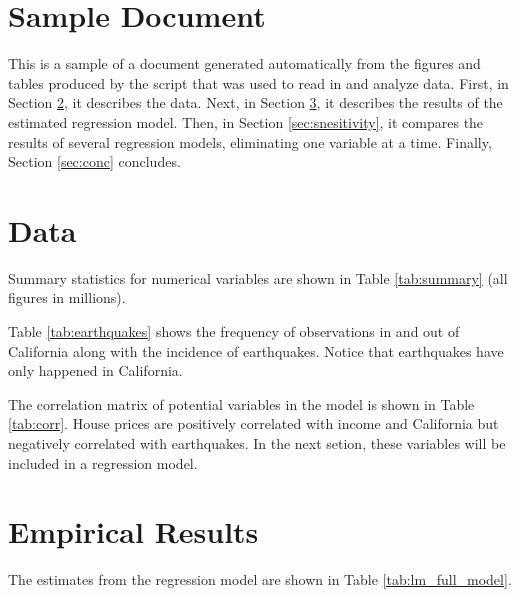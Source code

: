 \documentclass{paper}
\begin{document}

\section{Sample Document}

This is a sample of a document generated automatically from the figures and tables produced by
the script that was used to read in and analyze data.
First, in Section \ref{sec:data}, it describes the data.
Next, in Section \ref{sec:results}, it describes the results of the estimated regression model.
Then, in Section \ref{sec:snesitivity}, it compares the results of several regression models, eliminating one variable at a time.
Finally, Section \ref{sec:conc} concludes. 


\section{Data} \label{sec:data}

Summary statistics for numerical variables are shown in Table \ref{tab:summary} (all figures in millions).




Table \ref{tab:earthquakes} shows the frequency of observations in and out of California along with the incidence of earthquakes. Notice that earthquakes have only happened in California.



The correlation matrix of potential variables in the model is shown in Table \ref{tab:corr}.
House prices are positively correlated with income and California but negatively correlated with earthquakes. In the next setion, these variables will be included in a regression model.





\pagebreak
\section{Empirical Results}  \label{sec:results}


The estimates from the regression model are shown in Table \ref{tab:lm_full_model}.




\end{document}
